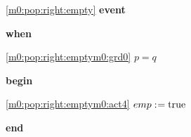 \noindent \ref{m0:pop:right:empty}  \textbf{event}
\begin{block}
  \item   \textbf{when}
  \begin{block}
  \item[ \eqref{m0:pop:right:emptym0:grd0} ]$p = q $ %
  \end{block}
  \item   \textbf{begin}
  \begin{block}
  \item[ \eqref{m0:pop:right:emptym0:act4} ]$emp \mathrel{:\mkern1mu=} \text{true} $ %
  \end{block}
  \item   \textbf{end} \\
\end{block}
